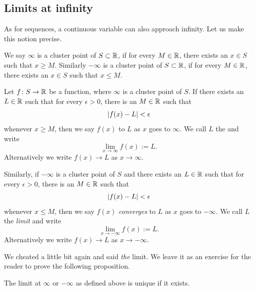 \subsection{Limits at infinity}

As for sequences, a continuous variable can also approach infinity.  Let
us make this notion precise.

\begin{defn}
We say $\infty$ is a cluster point of $S \subset {\mathbb{R}}$, if for every
$M \in {\mathbb{R}}$, there exists an $x \in S$ such that $x \geq M$.  Similarly
$- \infty$ is a cluster point of $S \subset {\mathbb{R}}$, if for every
$M \in {\mathbb{R}}$, there exists an $x \in S$ such that $x \leq M$.

%
Let $f \colon S \to {\mathbb{R}}$ be a function, where 
$\infty$ is a cluster point of $S$.
If there exists an $L \in {\mathbb{R}}$
such that for every $\epsilon > 0$, there is an $M \in {\mathbb{R}}$ such that
\begin{equation*}
\left\lvert {f(x) - L} \right\rvert < \epsilon 
\end{equation*}
whenever $x \geq M$, then we say $f(x)$ \emph{} to $L$
as $x$ goes to $\infty$.  We call $L$ the \emph{} and write
\begin{equation*}
\lim_{x \to \infty} f(x) := L .
\end{equation*}
Alternatively we write $f(x) \to L$ as $x \to \infty$.

Similarly, if $-\infty$ is a cluster point of $S$
and
there exists an $L \in {\mathbb{R}}$
such that for every $\epsilon > 0$, there is an $M \in {\mathbb{R}}$ such that
\begin{equation*}
\left\lvert {f(x) - L} \right\rvert < \epsilon 
\end{equation*}
whenever $x \leq M$, then we say $f(x)$ \emph{converges} to $L$
as $x$ goes to $-\infty$.  We call $L$ the \emph{limit} and write
\begin{equation*}
\lim_{x \to -\infty} f(x) := L .
\end{equation*}
Alternatively we write $f(x) \to L$ as $x \to -\infty$.
\end{defn}

We cheated a little bit again and said \emph{the} limit.
We leave it as an exercise for the reader to prove the following proposition.

\begin{prop} \label{liminfty:unique}
The limit at $\infty$ or $-\infty$ as defined above is unique if it exists.
\end{prop}

